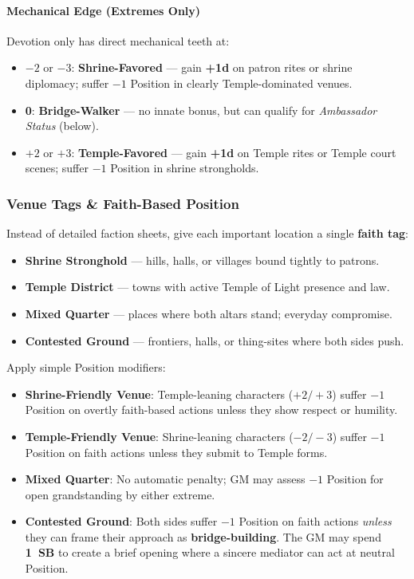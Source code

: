 \documentclass[11pt]{article}
\begin{document}
\paragraph*{Mechanical Edge (Extremes Only)}
Devotion only has direct mechanical teeth at:
\begin{itemize}
  \item \(-2\) or \(-3\): \textbf{Shrine-Favored} --- gain \textbf{+1d} on patron rites or shrine
        diplomacy; suffer \(-1\) Position in clearly Temple-dominated venues.
  \item \textbf{0}: \textbf{Bridge-Walker} --- no innate bonus, but can qualify for \emph{Ambassador
        Status} (below).
  \item \(+2\) or \(+3\): \textbf{Temple-Favored} --- gain \textbf{+1d} on Temple rites or Temple
        court scenes; suffer \(-1\) Position in shrine strongholds.
\end{itemize}

\subsubsection*{Venue Tags \& Faith-Based Position}

Instead of detailed faction sheets, give each important location a single \textbf{faith tag}:

\begin{itemize}
  \item \textbf{Shrine Stronghold} --- hills, halls, or villages bound tightly to patrons.
  \item \textbf{Temple District} --- towns with active Temple of Light presence and law.
  \item \textbf{Mixed Quarter} --- places where both altars stand; everyday compromise.
  \item \textbf{Contested Ground} --- frontiers, halls, or thing-sites where both sides push.
\end{itemize}

Apply simple Position modifiers:

\begin{itemize}
  \item \textbf{Shrine-Friendly Venue}: Temple-leaning characters (\(+2/+3\)) suffer
        \(-1\) Position on overtly faith-based actions unless they show respect or humility.
  \item \textbf{Temple-Friendly Venue}: Shrine-leaning characters (\(-2/-3\)) suffer
        \(-1\) Position on faith actions unless they submit to Temple forms.
  \item \textbf{Mixed Quarter}: No automatic penalty; GM may assess \(-1\) Position for open
        grandstanding by either extreme.
  \item \textbf{Contested Ground}: Both sides suffer \(-1\) Position on faith actions \emph{unless}
        they can frame their approach as \textbf{bridge-building}. The GM may spend \textbf{1~SB}
        to create a brief opening where a sincere mediator can act at neutral Position.
\end{itemize}
\end{document}

